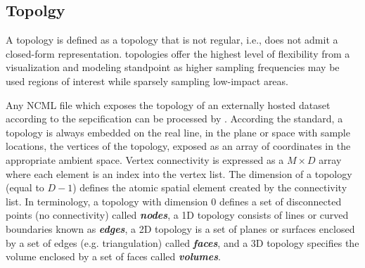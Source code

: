 \subsection{\ugrid{} Topolgy}
A \ugrid{} topology is  defined as a topology that is not regular, i.e.,
does not admit a closed-form representation. \ugrid{} topologies offer
the highest level of flexibility from a visualization and modeling
standpoint as higher sampling frequencies may be used regions of
interest while sparsely sampling low-impact areas.

Any NCML file which exposes the topology of an externally hosted
dataset according to the \cfugrid{} sepcification can be processed by
\sciwms{}. According the \cfugrid{} standard, a topology is always
embedded on the real line, in the plane or space with sample
locations, the vertices of the topology, exposed as an array of
coordinates in the appropriate ambient space. Vertex connectivity is
expressed as a $M \times D$ array where each element is an index into
the vertex list. The dimension of a topology (equal to $D - 1$) defines the
atomic spatial element created by the connectivity list. In \cfugrid{}
terminology, a topology with dimension 0 defines a set of disconnected
points (no connectivity) called \textbf{\textit{nodes}}, a 1D topology
consists of lines or curved boundaries known as
\textbf{\textit{edges}}, a 2D topology is a set of planes or surfaces
enclosed by a set of edges (e.g. triangulation) called
\textbf{\textit{faces}}, and a 3D topology specifies the volume enclosed
by a set of faces called \textbf{\textit{volumes}}.

